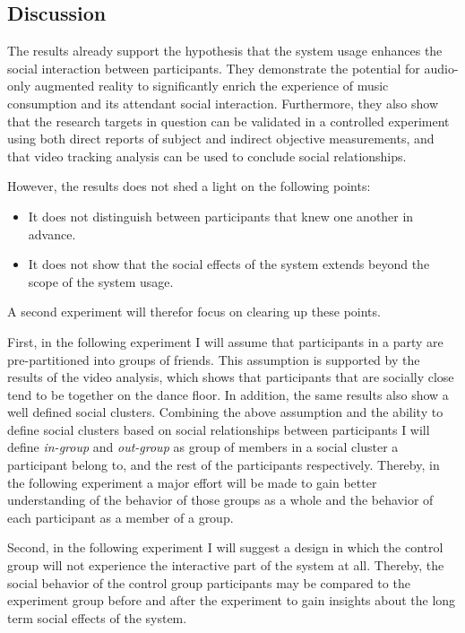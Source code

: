 \documentclass[a4paper,11pt]{article}
\newcommand{\definition}[1]{\emph{#1}}
\begin{document}
{\subsection{Discussion}

The results already support the hypothesis that the system usage enhances the social interaction between participants.
They demonstrate the potential for audio-only augmented reality to significantly enrich the experience of music consumption and its attendant social interaction.
Furthermore, they also show that the research targets in question can be validated in a controlled experiment using both direct reports of subject and indirect objective measurements, and that video tracking analysis can be used to conclude social relationships.

However, the results does not shed a light on the following points:

\begin{itemize}
	\item It does not distinguish between participants that knew one another in advance.
	\item It does not show that the social effects of the system extends beyond the scope of the system usage.
\end{itemize}

A second experiment will therefor focus on clearing up these points.

First, in the following experiment I will assume that participants in a party are pre-partitioned into groups of friends.
This assumption is supported by the results of the video analysis, which shows that participants that are socially close tend to be together on the dance floor.
In addition, the same results also show a well defined social clusters.
Combining the above assumption and the ability to define social clusters based on social relationships between participants I will define \definition{in-group} and \definition{out-group} as group of members in a social cluster a participant belong to, and the rest of the participants respectively.
Thereby, in the following experiment a major effort will be made to gain better understanding of the behavior of those groups as a whole and the behavior of each participant as a member of a group.

Second, in the following experiment I will suggest a design in which the control group will not experience the interactive part of the system at all.
Thereby, the social behavior of the control group participants may be compared to the experiment group before and after the experiment to gain insights about the long term social effects of the system.

}
\end{document}
